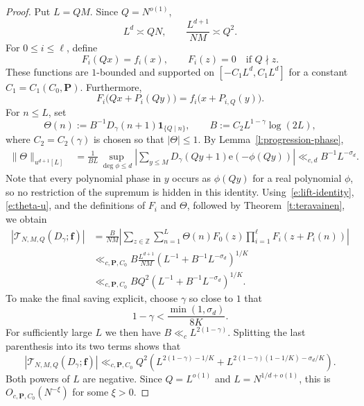 \documentclass[12pt]{amsart}
\newcommand{\Z}{\mathbb Z}
\newcommand{\1}{\mathbf 1}
\newcommand{\e}{\mathrm e}
\begin{document}
\begin{proof}
Put $L=QM$.  Since $Q=N^{o(1)}$,
\begin{equation}\label{e:lifting-scales}
 L^d\asymp QN,\qquad
 \frac{L^{d+1}}{NM}\asymp Q^2.
\end{equation}
For $0\leq i\leq\ell$, define
\[
 F_i(Qx)=f_i(x),\qquad F_i(z)=0\quad\text{if }Q\nmid z.
\]
These functions are $1$-bounded and supported on
$[-C_1L^d,C_1L^d]$ for a constant $C_1=C_1(C_0,\mathbf P)$.
Furthermore,
\begin{equation}\label{e:lift-identity}
 F_i\bigl(Qx+P_i(Qy)\bigr)
 =f_i\bigl(x+P_{i,Q}(y)\bigr).
\end{equation}
For $n\leq L$, set
\[
 \Theta(n):=B^{-1}D_\gamma(n+1)\1_{\{Q\mid n\}},
 \qquad B:=C_2L^{1-\gamma}\log(2L),
\]
where $C_2=C_2(\gamma)$ is chosen so that $|\Theta|\leq1$.  By
Lemma~\ref{l:progression-phase},
\begin{align}\label{e:theta-u}
 \|\Theta\|_{u^{d+1}[L]}
 &=\frac1{BL}
 \sup_{\deg\phi\leq d}
 \left|\sum_{y\leq M}D_\gamma(Qy+1)\e(-\phi(Qy))\right|\ll_{c,d}B^{-1}L^{-\sigma_d}.
\end{align}
Note that every polynomial phase in $y$ occurs as $\phi(Qy)$ for a
real polynomial $\phi$, so no restriction of the supremum is hidden in
this identity.
Using~\eqref{e:lift-identity}, \eqref{e:theta-u}, and the definitions of $F_i$ and $\Theta$,
followed by Theorem~\ref{t:teravainen}, we obtain
\begin{align*}
 \left|\mathcal T_{N,M,Q}(D_\gamma;\mathbf f)\right|
 &=\frac{B}{NM}
 \left|\sum_{z\in\Z}\sum_{n=1}^{L}
 \Theta(n)F_0(z)\prod_{i=1}^{\ell}F_i(z+P_i(n))\right|\\
 &\ll_{c,\mathbf P,C_0}
 B\frac{L^{d+1}}{NM}
 \left(L^{-1}+B^{-1}L^{-\sigma_d}\right)^{1/K}\\
 &\ll_{c,\mathbf P,C_0}
 BQ^2\left(L^{-1}+B^{-1}L^{-\sigma_d}\right)^{1/K}.
\end{align*}
To make the final saving explicit, choose $\gamma$ so close to $1$ that
\[
 1-\gamma<\frac{\min(1,\sigma_d)}{8K}.
\]
For sufficiently large $L$ we then have $B\ll_c L^{2(1-\gamma)}$.
Splitting the last parenthesis into its two terms shows that 
\[
 \left|\mathcal T_{N,M,Q}(D_\gamma;\mathbf f)\right| \ll_{c,\mathbf P,C_0}Q^2\left(
 L^{2(1-\gamma)-1/K}
 +L^{2(1-\gamma)(1-1/K)-\sigma_d/K}
 \right).
\]
Both powers of $L$ are negative.  Since $Q=L^{o(1)}$ and
$L=N^{1/d+o(1)}$, this is $O_{c,\mathbf P,C_0}(N^{-\xi})$ for some
$\xi>0$.
\end{proof}
\end{document}
